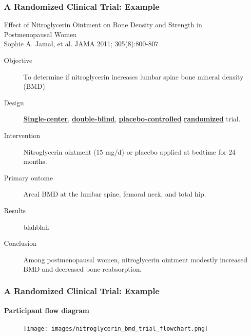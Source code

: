 \documentclass[table,10pt]{beamer}
\begin{document}
\begin{CJK*}{UTF8}{gbsn}
\begin{frame}[t]
\frametitle{A Randomized Clinical Trial: Example}
{\large \alert{Effect of Nitroglycerin Ointment on Bone Density
and Strength in Postmenopausal Women}}\\
\small{Sophie A. Jamal, et al. JAMA 2011; 305(8):800-807}
\begin{description}
	\item[Objective]To determine if nitroglycerin increases 
		lumbar spine bone mineral density (BMD)
	\item[Design]\underline{\bf Single-center}, \underline{\bf double-blind}, \underline{\bf placebo-controlled} 
		\underline{\bf randomized} trial.
	\item[Intervention]Nitroglycerin ointment (15 mg/d) or placebo 
		applied at bedtime for 24 months.
	\item[Primary outome]Areal BMD at the lumbar spine, femoral neck, 
		and total hip.
	\item[Results]blahblah
	\item[Conclusion]Among postmenopausal women, nitroglycerin ointment 
		modestly increased BMD and decreased bone reabsorption.
\end{description}
\end{frame}


\begin{frame}[t]
\frametitle{A Randomized Clinical Trial: Example}
\framesubtitle{Participant flow diagram}
\begin{figure}
\texttt{[image: images/nitroglycerin\_bmd\_trial\_flowchart.png]}
\end{figure}
\end{frame}


\end{CJK*}
\end{document}
